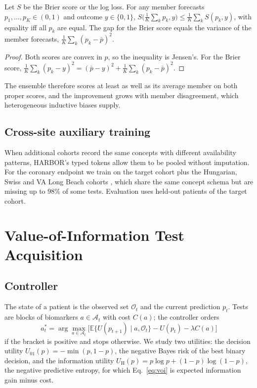 \begin{proposition}\label{prop:ens}
Let $S$ be the Brier score or the log loss. For any member forecasts $p_1,\dots,p_K\in(0,1)$ and outcome $y\in\{0,1\}$,
$S\big(\tfrac1K\sum_kp_k,y\big)\le\tfrac1K\sum_kS(p_k,y)$, with equality iff all $p_k$ are equal. The gap for the Brier score equals the variance of the member forecasts, $\tfrac1K\sum_k(p_k-\bar p)^2$.
\end{proposition}
\begin{proof}
Both scores are convex in $p$, so the inequality is Jensen's. For the Brier score, $\tfrac1K\sum_k(p_k-y)^2=(\bar p-y)^2+\tfrac1K\sum_k(p_k-\bar p)^2$.
\end{proof}
The ensemble therefore scores at least as well as its average member on both proper scores, and the improvement grows with member disagreement, which heterogeneous inductive biases supply.

\subsection{Cross-site auxiliary training}
When additional cohorts record the same concepts with different availability patterns, HARBOR's typed tokens allow them to be pooled without imputation. For the coronary endpoint we train on the target cohort plus the Hungarian, Swiss and VA Long Beach cohorts \cite{uciheart}, which share the same concept schema but are missing up to 98\% of some tests. Evaluation uses held-out patients of the target cohort.

\section{Value-of-Information Test Acquisition}\label{sec:voi}
\subsection{Controller}
The state of a patient is the observed set $\mathcal{O}_t$ and the current prediction $p_t$. Tests are blocks of biomarkers $a\in\mathcal{A}_t$ with cost $C(a)$; the controller orders
\begin{equation}\label{eq:voi}
a^*_t=\arg\max_{a\in\mathcal{A}_t}\Big[\mathbb{E}\{U(p_{t+1})\mid a,\mathcal{O}_t\}-U(p_t)-\lambda C(a)\Big]
\end{equation}
if the bracket is positive and stops otherwise. We study two utilities: the decision utility $U_{01}(p)=-\min(p,1-p)$, the negative Bayes risk of the best binary decision, and the information utility $U_{\mathrm H}(p)=p\log p+(1-p)\log(1-p)$, the negative predictive entropy, for which Eq.~\eqref{eq:voi} is expected information gain minus cost.

